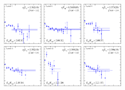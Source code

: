 \begin{figure}[H]
    \includegraphics[width=0.18\textwidth]{figures/sigmas/g2u/fits/fit_5.pdf}
    \includegraphics[width=0.18\textwidth]{figures/sigmas/g2u/fits/fit_3.pdf}
    \includegraphics[width=0.18\textwidth]{figures/sigmas/g2u/fits/fit_11.pdf}\\
    \includegraphics[width=0.18\textwidth]{figures/sigmas/g2u/fits/fit_6.pdf}
    \includegraphics[width=0.18\textwidth]{figures/sigmas/g2u/fits/fit_25.pdf}
    \includegraphics[width=0.18\textwidth]{figures/sigmas/g2u/fits/fit_10.pdf}

\end{figure}
